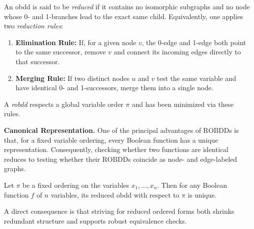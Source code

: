\begin{definition}[[\acrfull{robdd}]
\label{def:reducedobdd}
An \acrshort{obdd} is said to be \emph{reduced} if it contains no isomorphic subgraphs and no node whose 0- and 1-branches lead to the exact same child. Equivalently, one applies two \textit{reduction rules}:
\begin{enumerate}
\item \textbf{Elimination Rule:} If, for a given node $v$, the 0-edge and 1-edge both point to the same successor, remove $v$ and connect its incoming edges directly to that successor.
\item \textbf{Merging Rule:} If two distinct nodes $u$ and $v$ test the same variable and have identical 0- and 1-successors, merge them into a single node.
\end{enumerate}
A \emph{\acrfull{robdd}} respects a global variable order $\pi$ and has been minimized via these rules.
\end{definition}

\textbf{Canonical Representation.} One of the principal advantages of $\mathrm{ROBDD}$s is that, for a fixed variable ordering, every Boolean function has a unique representation. Consequently, checking whether two functions are identical reduces to testing whether their $\mathrm{ROBDD}$s coincide as node- and edge-labeled graphs.

\begin{theorem}
\label{thm:canonical}
Let $\pi$ be a fixed ordering on the variables ${x_1,\dots,x_n}$. Then for any Boolean function $f$ of $n$ variables, its reduced \acrshort{obdd} with respect to $\pi$ is unique.
\end{theorem}

A direct consequence is that striving for reduced ordered forms both shrinks redundant structure and supports robust equivalence checks.
